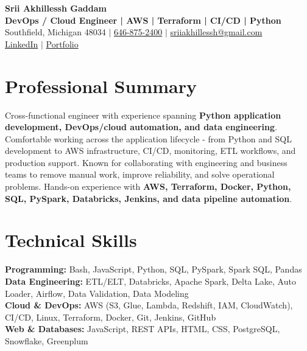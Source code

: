 \documentclass[letterpaper,10pt]{article}
\begin{document}
\fontsize{9.35pt}{10.45pt}\selectfont

\begin{center}
    {\LARGE \textbf{Srii Akhillessh Gaddam}} \\[-1pt]
    \textbf{DevOps / Cloud Engineer | AWS | Terraform | CI/CD | Python} \\[2pt]
    Southfield, Michigan 48034 $|$
    \href{tel:6468752400}{646-875-2400} $|$
    \href{mailto:sriiakhillessh@gmail.com}{sriiakhillessh@gmail.com} \\[1pt]
    \href{https://www.linkedin.com/in/srii-akhiilessh-gaddam-b48668191/}{LinkedIn} $|$
    \href{https://sriiakhillesshg.github.io/portfolio/}{Portfolio}
\end{center}
\vspace{-8pt}

\section{Professional Summary}
\small{Cross-functional engineer with experience spanning \textbf{Python application development, DevOps/cloud automation, and data engineering}. Comfortable working across the application lifecycle - from Python and SQL development to AWS infrastructure, CI/CD, monitoring, ETL workflows, and production support. Known for collaborating with engineering and business teams to remove manual work, improve reliability, and solve operational problems. Hands-on experience with \textbf{AWS, Terraform, Docker, Python, SQL, PySpark, Databricks, Jenkins, and data pipeline automation}.}

\section{Technical Skills}
\small{
\textbf{Programming:} Bash, JavaScript, Python, SQL, PySpark, Spark SQL, Pandas \\
\textbf{Data Engineering:} ETL/ELT, Databricks, Apache Spark, Delta Lake, Auto Loader, Airflow, Data Validation, Data Modeling \\
\textbf{Cloud \& DevOps:} AWS (S3, Glue, Lambda, Redshift, IAM, CloudWatch), CI/CD, Linux, Terraform, Docker, Git, Jenkins, GitHub \\
\textbf{Web \& Databases:} JavaScript, REST APIs, HTML, CSS, PostgreSQL, Snowflake, Greenplum
}
\end{document}

